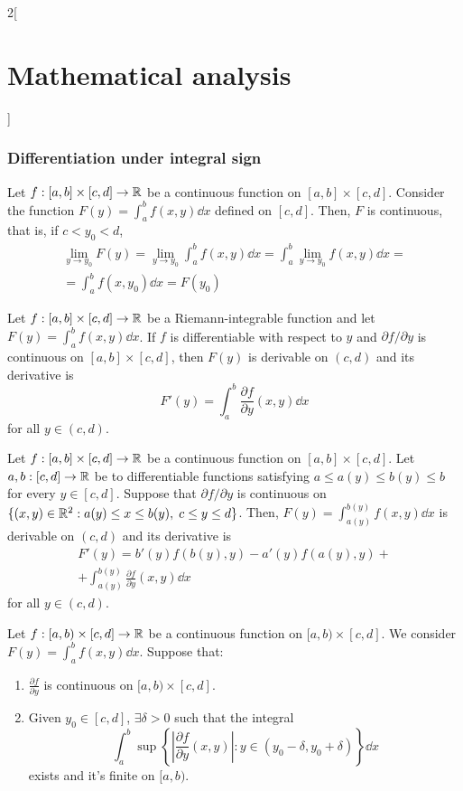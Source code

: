 \documentclass[../../../main.tex]{subfiles}
\begin{document}
\begin{multicols}{2}[\section{Mathematical analysis}]
  \subsubsection{Differentiation under integral sign}
  \begin{theorem}
    Let $f:[a,b]\times[c,d]\rightarrow\mathbb{R} $ be a continuous function on $[a,b]\times[c,d]$. Consider the function $\displaystyle F(y)=\int_a^bf(x,y)\dd{x}$ defined on $[c,d]$. Then, $F$ is continuous, that is, if $c<y_0<d$,
    \begin{multline*}
      \lim_{y\to y_0}F(y)=\lim_{y\to y_0}\int_a^bf(x,y)\dd{x}=\int_a^b\lim_{y\to y_0}f(x,y)\dd{x}=\\=\int_a^bf(x,y_0)\dd{x}=F(y_0)
    \end{multline*}
  \end{theorem}
  \begin{theorem}
    Let $f:[a,b]\times[c,d]\rightarrow\mathbb{R} $ be a Riemann-integrable function and let $\displaystyle F(y)=\int_a^bf(x,y)\dd{x}$. If $f$ is differentiable with respect to $y$ and $\partial f/\partial y$ is continuous on $[a,b]\times[c,d]$, then $F(y)$ is derivable on $(c,d)$ and its derivative is $$F'(y)=\int_a^b\frac{\partial f}{\partial y}(x,y)\dd{x}$$ for all $y\in(c,d)$.
  \end{theorem}
  \begin{theorem}
    Let $f:[a,b]\times[c,d]\rightarrow\mathbb{R} $ be a continuous function on $[a,b]\times[c,d]$. Let $a,b:[c,d]\rightarrow\mathbb{R} $ be to differentiable functions satisfying $a\leq a(y)\leq b(y)\leq b$ for every $y\in[c,d]$. Suppose that $\partial f/\partial y$ is continuous on $\{(x,y)\in\mathbb{R}^2:a(y)\leq x\leq b(y),\; c\leq y\leq d\}$. Then, $\displaystyle F(y)=\int_{a(y)}^{b(y)}f(x,y)\dd{x}$ is derivable on $(c,d)$ and its derivative is
    \begin{multline*}
      F'(y)=b'(y)f(b(y),y)-a'(y)f(a(y),y)+\\+\int_{a(y)}^{b(y)}\frac{\partial f}{\partial y}(x,y)\dd{x}
    \end{multline*} for all $y\in(c,d)$.
  \end{theorem}
  \begin{theorem}
    Let $f:[a,b)\times[c,d]\rightarrow\mathbb{R} $ be a continuous function on $[a,b)\times[c,d]$. We consider $\displaystyle F(y)=\int_a^bf(x,y)\dd{x}$. Suppose that:
    \begin{enumerate}
      \item $\displaystyle\frac{\partial f}{\partial y}$ is continuous on $[a,b)\times[c,d]$.
      \item Given $y_0\in[c,d]$, $\exists\delta>0$ such that the integral $$\int_a^b\sup\left\{\left|\frac{\partial f}{\partial y}(x,y)\right|:y\in(y_0-\delta,y_0+\delta)\right\}\dd{x}$$ exists and it's finite on $[a,b)$.

\end{enumerate}
\end{theorem}
\end{multicols}
\end{document}

